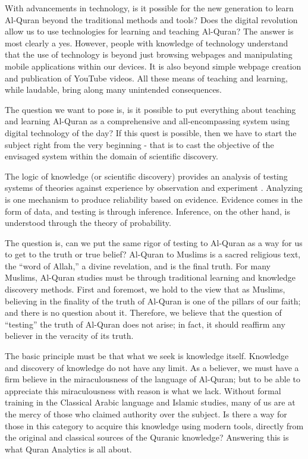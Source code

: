 \documentclass[
]{article}
\begin{document}
With advancements in technology, is it possible for the new generation to learn Al-Quran beyond the traditional methods and tools? Does the digital revolution allow us to use technologies for learning and teaching Al-Quran? The answer is most clearly a yes. However, people with knowledge of technology understand that the use of technology is beyond just browsing webpages and manipulating mobile applications within our devices. It is also beyond simple webpage creation and publication of YouTube videos. All these means of teaching and learning, while laudable, bring along many unintended consequences.

The question we want to pose is, is it possible to put everything about teaching and learning Al-Quran as a comprehensive and all-encompassing system using digital technology of the day? If this quest is possible, then we have to start the subject right from the very beginning - that is to cast the objective of the envisaged system within the domain of scientific discovery.

The logic of knowledge (or scientific discovery) provides an analysis of testing systems of theories against experience by observation and experiment \citep{popper1992}. Analyzing is one mechanism to produce reliability based on evidence. Evidence comes in the form of data, and testing is through inference. Inference, on the other hand, is understood through the theory of probability.

The question is, can we put the same rigor of testing to Al-Quran as a way for us to get to the truth or true belief? Al-Quran to Muslims is a sacred religious text, the ``word of Allah,'' a divine revelation, and is the final truth. For many Muslims, Al-Quran studies must be through traditional learning and knowledge discovery methods. First and foremost, we hold to the view that as Muslims, believing in the finality of the truth of Al-Quran is one of the pillars of our faith; and there is no question about it. Therefore, we believe that the question of ``testing'' the truth of Al-Quran does not arise; in fact, it should reaffirm any believer in the veracity of its truth.

The basic principle must be that what we seek is knowledge itself. Knowledge and discovery of knowledge do not have any limit. As a believer, we must have a firm believe in the miraculousness of the language of Al-Quran; but to be able to appreciate this miraculousness with reason is what we lack. Without formal training in the Classical Arabic language and Islamic studies, many of us are at the mercy of those who claimed authority over the subject. Is there a way for those in this category to acquire this knowledge using modern tools, directly from the original and classical sources of the Quranic knowledge? Answering this is what Quran Analytics is all about.
\end{document}
